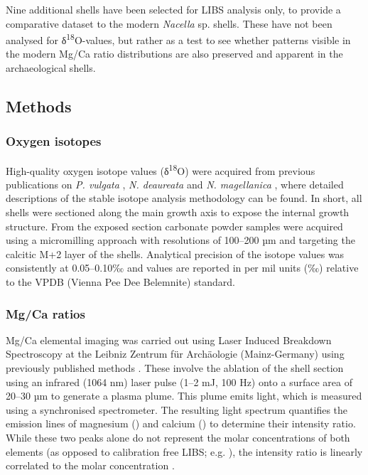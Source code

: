 \documentclass[
  authoryear,
  preprint,
  3p]{elsarticle}
\begin{document}
Nine additional shells have been selected for LIBS analysis only, to
provide a comparative dataset to the modern \emph{Nacella} sp. shells.
These have not been analysed for δ\textsuperscript{18}O-values, but
rather as a test to see whether patterns visible in the modern Mg/Ca
ratio distributions are also preserved and apparent in the
archaeological shells.

\subsection{Methods}\label{methods}

\subsubsection{Oxygen isotopes}\label{oxygen-isotopes}

High-quality oxygen isotope values (δ\textsuperscript{18}O) were
acquired from previous publications on \emph{P. vulgata}
\citep{Surge2012-ba, Graniero2017-io}, \emph{N. deaureata} and \emph{N.
magellanica} \citep{Nicastro2020-ih}, where detailed descriptions of the
stable isotope analysis methodology can be found. In short, all shells
were sectioned along the main growth axis to expose the internal growth
structure. From the exposed section carbonate powder samples were
acquired using a micromilling approach with resolutions of 100--200 µm
and targeting the calcitic M+2 layer of the shells. Analytical precision
of the isotope values was consistently at 0.05--0.10‰ and values are
reported in per mil units (‰) relative to the VPDB (Vienna Pee Dee
Belemnite) standard.

\subsubsection{Mg/Ca ratios}\label{mgca-ratios}

Mg/Ca elemental imaging was carried out using Laser Induced Breakdown
Spectroscopy at the Leibniz Zentrum für Archäologie (Mainz-Germany)
using previously published methods \citep{Hausmann2023-ih}. These
involve the ablation of the shell section using an infrared (1064 nm)
laser pulse (1--2 mJ, 100 Hz) onto a surface area of 20--30 µm to
generate a plasma plume. This plume emits light, which is measured using
a synchronised spectrometer. The resulting light spectrum quantifies the
emission lines of magnesium () and calcium () to determine their
intensity ratio. While these two peaks alone do not represent the molar
concentrations of both elements (as opposed to calibration free LIBS;
e.g. \citep{Martinez-Minchero2022-jz}), the intensity ratio is linearly
correlated to the molar concentration \citep{Hausmann2017-oa}.
\end{document}
